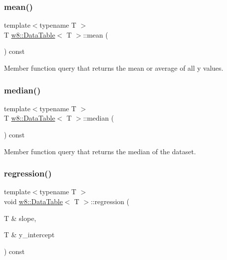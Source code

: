 \subsubsection{\texorpdfstring{mean()}{mean()}}
{\footnotesize\ttfamily template$<$typename T $>$ \\
T \mbox{\hyperlink{classw8_1_1DataTable}{w8\+::\+Data\+Table}}$<$ T $>$\+::mean (\begin{DoxyParamCaption}{ }\end{DoxyParamCaption}) const\hspace{0.3cm}{\ttfamily [inline]}}

Member function query that returns the mean or average of all y values. \mbox{\label{classw8_1_1DataTable_a70bf19f3fe4003c0ebaee0f978a7ab5f}} 
\subsubsection{\texorpdfstring{median()}{median()}}
{\footnotesize\ttfamily template$<$typename T $>$ \\
T \mbox{\hyperlink{classw8_1_1DataTable}{w8\+::\+Data\+Table}}$<$ T $>$\+::median (\begin{DoxyParamCaption}{ }\end{DoxyParamCaption}) const\hspace{0.3cm}{\ttfamily [inline]}}

Member function query that returns the median of the dataset. \mbox{\label{classw8_1_1DataTable_a258b4c9bcac9a4eb60cb7e6f1131cf5f}} 
\subsubsection{\texorpdfstring{regression()}{regression()}}
{\footnotesize\ttfamily template$<$typename T $>$ \\
void \mbox{\hyperlink{classw8_1_1DataTable}{w8\+::\+Data\+Table}}$<$ T $>$\+::regression (\begin{DoxyParamCaption}\item[{T \&}]{slope,  }\item[{T \&}]{y\+\_\+intercept }\end{DoxyParamCaption}) const\hspace{0.3cm}{\ttfamily [inline]}}

